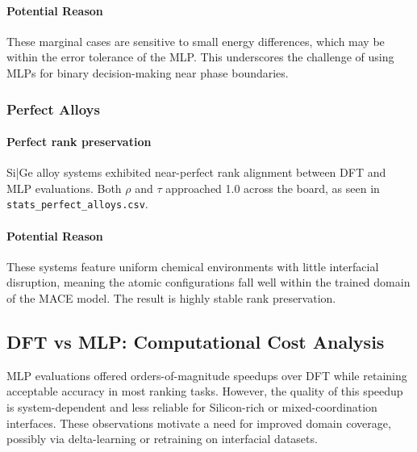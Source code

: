 \paragraph{Potential Reason}

These marginal cases are sensitive to small energy differences, which may be within the error tolerance of the MLP. This underscores the challenge of using MLPs for binary decision-making near phase boundaries.

\subsubsection{Perfect Alloys}

\paragraph{Perfect rank preservation}

Si|Ge alloy systems exhibited near-perfect rank alignment between DFT and MLP evaluations. Both $\rho$ and $\tau$ approached 1.0 across the board, as seen in \texttt{stats\_perfect\_alloys.csv}.

\paragraph{Potential Reason}

These systems feature uniform chemical environments with little interfacial disruption, meaning the atomic configurations fall well within the trained domain of the MACE model. The result is highly stable rank preservation.

\subsection{DFT vs MLP: Computational Cost Analysis}

MLP evaluations offered orders-of-magnitude speedups over DFT while retaining acceptable accuracy in most ranking tasks. However, the quality of this speedup is system-dependent and less reliable for Silicon-rich or mixed-coordination interfaces. These observations motivate a need for improved domain coverage, possibly via delta-learning or retraining on interfacial datasets.